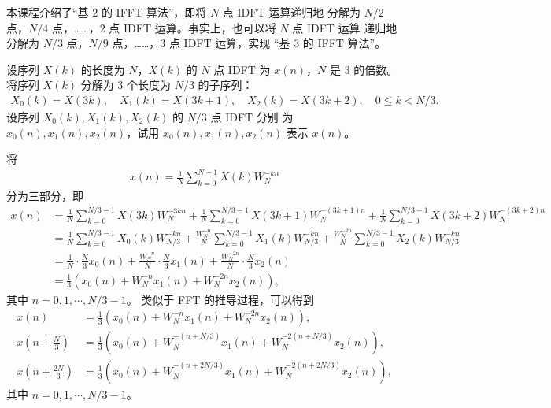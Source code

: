 \begin{exercise}
    本课程介绍了``基 $2$ 的 IFFT 算法''，即将 $N$ 点 IDFT 运算递归地
    分解为 $N/2$ 点，$N/4$ 点，……，$2$ 点 IDFT 运算。事实上，也可以将 $N$ 点 IDFT 运算
    递归地分解为 $N/3$ 点，$N/9$ 点，……，$3$ 点 IDFT 运算，实现 ``基 $3$ 的 IFFT 算法''。

    设序列 $X(k)$ 的长度为 $N$，$X(k)$ 的 $N$ 点 IDFT 为 $x(n)$，$N$ 是 $3$ 的倍数。
    将序列 $X(k)$ 分解为 $3$ 个长度为 $N/3$ 的子序列：
    \begin{align*}
        X_0(k) = X(3k), \quad X_1(k) = X(3k + 1), \quad X_2(k) = X(3k + 2), \quad 0 \le k < N/3.
    \end{align*}
    设序列 $X_0(k), X_1(k), X_2(k)$ 的 $N/3$ 点 IDFT 分别
    为 $x_0(n), x_1(n), x_2(n)$，试用 $x_0(n), x_1(n), x_2(n)$ 表示 $x(n)$。
\end{exercise}

\begin{solution}
    将
    \begin{align*}
        x(n) = \frac{1}{N}\sum_{k = 0}^{N - 1}X(k)W_N^{-kn}
    \end{align*}
    分为三部分，即
    \begin{align*}
        x(n) & = \frac{1}{N}\sum_{k = 0}^{N/3 - 1}X(3k)W_N^{-3kn}
            + \frac{1}{N}\sum_{k = 0}^{N/3 - 1}X(3k + 1)W_N^{-(3k + 1)n}
            + \frac{1}{N}\sum_{k = 0}^{N/3 - 1}X(3k + 2)W_N^{-(3k + 2)n} \\
            & = \frac{1}{N}\sum_{k = 0}^{N/3 - 1}X_0(k)W_{N/3}^{-kn}
            + \frac{W_N^{-n}}{N}\sum_{k = 0}^{N/3 - 1}X_1(k)W_{N/3}^{-kn}
            + \frac{W_N^{-2n}}{N}\sum_{k = 0}^{N/3 - 1}X_2(k)W_{N/3}^{-kn} \\
            & = \frac{1}{N}\cdot\frac{N}{3}x_0(n)
            + \frac{W_N^{-n}}{N}\cdot\frac{N}{3}x_1(n)
            + \frac{W_N^{-2n}}{N}\cdot\frac{N}{3}x_2(n) \\
            & = \frac{1}{3}\left(x_0(n) + W_N^{-n}x_1(n) + W_N^{-2n}x_2(n)\right),
    \end{align*}
    其中 $n = 0, 1, \cdots, N / 3 - 1$。
    类似于 FFT 的推导过程，可以得到
    \begin{align*}
        x(n) & = \frac{1}{3}\left(x_0(n) + W_N^{-n}x_1(n) + W_N^{-2n}x_2(n)\right), \\
        x\left(n + \frac{N}{3}\right) & = \frac{1}{3}\left(x_0(n) + W_N^{-(n + N/3)}x_1(n) + W_N^{-2(n + N/3)}x_2(n)\right), \\
        x\left(n + \frac{2N}{3}\right) & = \frac{1}{3}\left(x_0(n) + W_N^{-(n + 2N/3)}x_1(n) + W_N^{-2(n + 2N/3)}x_2(n)\right),
    \end{align*}
    其中 $n = 0, 1, \cdots, N / 3 - 1$。
\end{solution}

